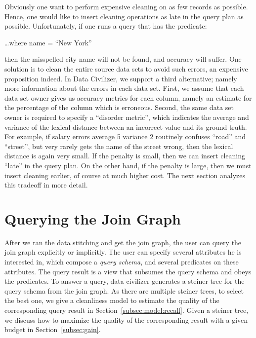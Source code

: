 Obviously one want to perform expensive cleaning on as few records as possible.
Hence, one would like to insert cleaning operations as late in the query plan as
possible.  Unfortunately, if one runs a query that has the predicate:

…where name = “New York”

then the misspelled city name will not be found, and accuracy will suffer.  One
solution is to clean the entire source data sets to avoid such errors, an
expensive proposition indeed.  In Data Civilizer, we support a third
alternative; namely more information about the errors in each data set.  First,
we assume that each data set owner gives us accuracy metrics for each column,
namely an estimate for the percentage of the column which is erroneous.  Second,
the same data set owner is required to specify a “disorder metric”, which
indicates the average and variance of the lexical distance between an incorrect
value and its ground truth.  For example, if salary errors average 5%
variance 2%
routinely confuses “road” and “street”, but very rarely gets the name of the
street wrong, then the lexical distance is again very small.   If the penalty is
small, then we can insert cleaning “late” in the query plan.  On the other hand,
if the penalty is large, then we must insert cleaning earlier, of course at much
higher cost.  The next section analyzes this tradeoff in more detail.

\section{Querying the Join Graph}\label{sec:enhancedstitching}

After we ran the data stitching and get the join graph, the user can query the
join graph explicitly or implicitly. The user can specify several attributes he
is interested in, which compose a \emph{query schema}, and several predicates on
these attributes. The query result is a view that subsumes the query schema and
obeys the predicates. To answer a query, data civilizer generates a steiner tree
for the query schema from the join graph. As there are multiple steiner trees,
to select the best one, we give a cleanliness model to estimate the quality of
the corresponding query result in Section~\ref{subsec:model:recall}. Given a
steiner tree, we discuss how to maximize the quality of the corresponding result
with a given budget in Section~\ref{subsec:gain}.

